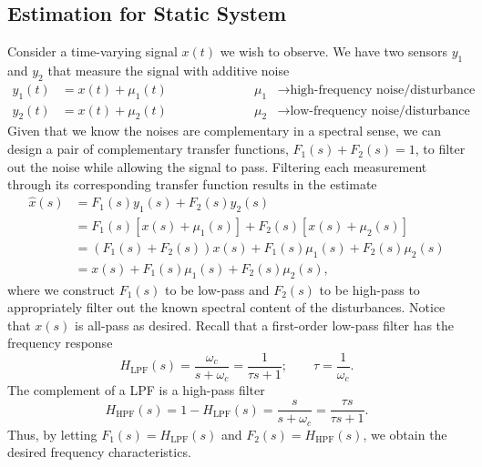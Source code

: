 \documentclass[a4paper]{article}
\begin{document}
\subsection*{Estimation for Static System}
Consider a time-varying signal $x(t)$ we wish to observe.
We have two sensors $y_1$ and $y_2$ that measure the signal with additive noise
\begin{equation}
\begin{split}
y_1(t) &= x(t) + \mu_1(t) \\
y_2(t) &= x(t) + \mu_2(t)
\end{split}
\qquad\qquad\qquad
\begin{split}
\mu_1 &\rightarrow \text{high-frequency noise/disturbance} \\
\mu_2 &\rightarrow \text{low-frequency noise/disturbance}
\end{split}
\end{equation}
Given that we know the noises are complementary in a spectral sense, we can design a pair of complementary transfer functions, $F_1(s) + F_2(s) = 1$, to filter out the noise while allowing the signal to pass.
Filtering each measurement through its corresponding transfer function results in the estimate
\begin{align}
\hat{x}(s) &= F_1(s)y_1(s) + F_2(s)y_2(s) \nonumber \\
           &= F_1(s)\left[x(s) + \mu_1(s)\right] + F_2(s)\left[x(s) + \mu_2(s)\right] \label{eq:scf_estimator} \\
           &= (F_1(s)+F_2(s))x(s) + F_1(s)\mu_1(s) + F_2(s)\mu_2(s) \nonumber \\
           &= x(s) + F_1(s)\mu_1(s) + F_2(s)\mu_2(s), \label{eq:scf_estimate}
\end{align}
where we construct $F_1(s)$ to be low-pass and $F_2(s)$ to be high-pass to appropriately filter out the known spectral content of the disturbances.
Notice that $x(s)$ is all-pass as desired.
Recall that a first-order low-pass filter has the frequency response
\begin{equation}
H_\text{LPF}(s) = \frac{\omega_c}{s+\omega_c} = \frac{1}{\tau s+1};\qquad\tau=\frac{1}{\omega_c}.
\end{equation}
The complement of a LPF is a high-pass filter
\begin{equation}
H_\text{HPF}(s) = 1 - H_\text{LPF}(s) = \frac{s}{s+\omega_c} = \frac{\tau s}{\tau s+1}.
\end{equation}
Thus, by letting $F_1(s)=H_\text{LPF}(s)$ and $F_2(s)=H_\text{HPF}(s)$, we obtain the desired frequency characteristics.
\end{document}

